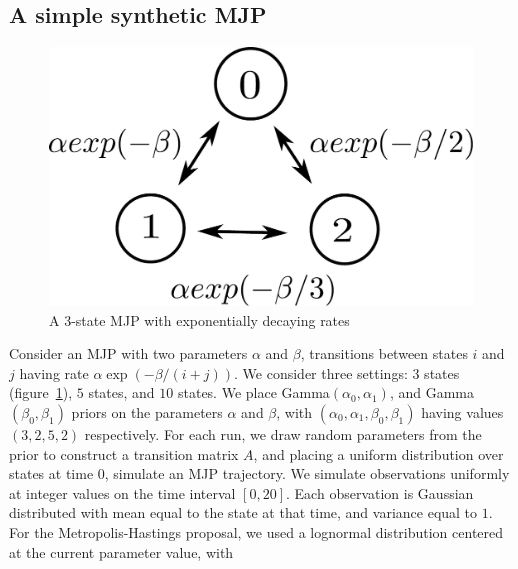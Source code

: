 \subsection{A simple synthetic MJP}
\begin{figure}
  \begin{minipage}[!hp]{.15\linewidth}
    \hspace{.1in}
  \end{minipage}
  \begin{minipage}[!hp]{.8\linewidth}
  \centering
    \includegraphics [width=\textwidth, angle=0]{figs/exp_model.pdf}
    \caption{A 3-state MJP with exponentially decaying rates}
      \end{minipage}
    \label{fig:exp_model}
    \vspace{-.1in}
  \end{figure}
Consider an MJP with two parameters $\alpha$ and $\beta$, 
transitions between states $i$ and $j$ having rate $\alpha \exp(-\beta/(i+j))$.
We consider three settings: $3$ states (figure~\ref{fig:exp_model}),
$5$ states, and $10$ states.
We place Gamma$(\alpha_0,\alpha_1)$, and Gamma$(\beta_0, \beta_1)$ priors on 
the parameters $\alpha$ and $\beta$, with $(\alpha_0,\alpha_1,\beta_0,\beta_1)$ 
having values $(3,2,5,2)$ respectively. For each run, we draw random parameters 
from the prior to construct a transition matrix $A$, and placing a uniform 
distribution over states at time $0$, simulate an MJP trajectory.
We simulate observations uniformly at integer values on the time interval 
$[0, 20]$. Each observation is Gaussian distributed with mean equal to the state
at that time, and variance equal to $1$.  For the Metropolis-Hastings proposal, 
we used a lognormal distribution centered at the current parameter value, with 
